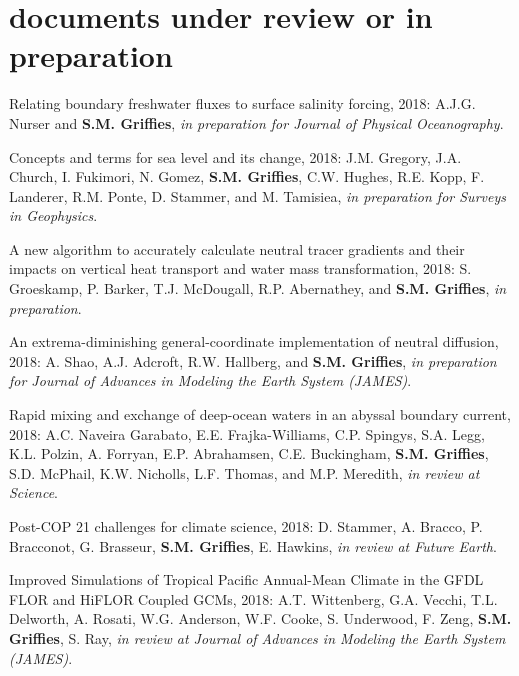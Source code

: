 \section*{\sc \color{Maroon} documents under review or in preparation}

\small 


\begin{etaremune}

\item Relating boundary freshwater fluxes to surface salinity forcing, 2018: A.J.G. Nurser and {\bf S.M. Grif\/f\/ies}, {\it in preparation for Journal of Physical Oceanography}.

\item Concepts and terms for sea level and its change, 2018: J.M. Gregory, J.A. Church, I. Fukimori, N. Gomez, {\bf S.M. Grif\/f\/ies}, C.W. Hughes, R.E. Kopp, F. Landerer, R.M. Ponte, D. Stammer, and M. Tamisiea, {\it in preparation for Surveys in Geophysics}.

\item A new algorithm to accurately calculate neutral tracer gradients and their impacts on vertical heat transport and water mass transformation, 2018: S. Groeskamp, P. Barker, T.J. McDougall, R.P. Abernathey, and {\bf S.M. Grif\/f\/ies}, {\it in preparation}.

\item An extrema-diminishing general-coordinate implementation of neutral diffusion, 2018: A. Shao, A.J. Adcroft, R.W. Hallberg, and {\bf S.M. Grif\/f\/ies}, {\it in preparation for Journal of Advances in Modeling the Earth System (JAMES)}.

\item Rapid mixing and exchange of deep-ocean waters in an abyssal boundary current, 2018: A.C. Naveira Garabato, E.E. Frajka-Williams, C.P. Spingys, S.A. Legg, K.L. Polzin, A. Forryan, E.P. Abrahamsen, C.E. Buckingham, {\bf S.M. Grif\/f\/ies}, S.D. McPhail, K.W. Nicholls, L.F. Thomas, and M.P. Meredith,  {\it in review at Science}.

\item Post-COP 21 challenges for climate science, 2018: D. Stammer, A. Bracco, P. Bracconot, G. Brasseur, {\bf S.M. Grif\/f\/ies}, E. Hawkins, {\it in review at Future Earth}.

\item Improved Simulations of Tropical Pacific Annual-Mean Climate in the GFDL FLOR and HiFLOR Coupled GCMs, 2018:  A.T. Wittenberg, G.A. Vecchi, T.L. Delworth, A. Rosati, W.G. Anderson, W.F. Cooke, S. Underwood, F. Zeng, {\bf S.M. Grif\/f\/ies}, S. Ray, {\it in review at Journal of Advances in Modeling the Earth System (JAMES)}. 


\end{etaremune}
